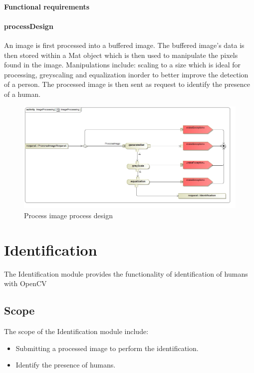 \documentclass[a4paper,12pt]{report}
\begin{document}
		\FloatBarrier
		\paragraph {Functional requirements}

		\FloatBarrier
		\paragraph {processDesign}
		An image is first processed into a buffered image. The buffered image's data is then stored within a Mat object which is then used to manipulate the pixels found in the image. Manipulations include: scaling to a size which is ideal for processing, greyscaling and equalization inorder to better improve the detection of a person. The processed image is then sent as request to identify the presence of a human.
		\begin{figure}[htb]
			\centering
			\includegraphics [scale=0.5]{../Diagrams/ImageProcessing.jpg}
			\caption{Process image process design}
		\end{figure}	

\FloatBarrier	
\section {Identification}
The Identification module provides the functionality of identification of humans with OpenCV

	\FloatBarrier	
	\subsection {Scope}
	The scope of the Identification module include:
		\begin {itemize}
			\item Submitting a processed image to perform the identification.
			\item Identify the presence of humans.
		\end {itemize}
\end{document}
